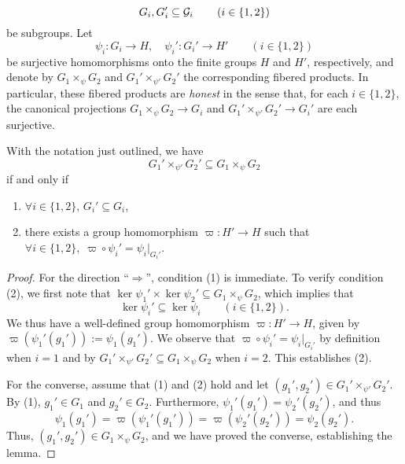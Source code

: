 \[
G_i, G_i' \subseteq \mathcal{G}_i \quad\quad \left( i \in \{1, 2 \} \right)
\]
be subgroups.  Let
\[
\psi_i : G_i \longrightarrow H, \quad \psi_i' : G_i' \longrightarrow H' \quad\quad \left( i \in \{1, 2 \} \right)
\]
be surjective homomorphisms onto the finite groups $H$ and $H'$, respectively, and denote by $G_1 \times_\psi G_2$ and $G_1' \times_{\psi'} G_2'$ the corresponding fibered products.  In particular, these fibered products are \emph{honest} in the sense that, for each $i \in \{1, 2 \}$, the canonical projections $G_1 \times_\psi G_2 \longrightarrow G_i$ and $G_1' \times_{\psi'} G_2' \longrightarrow G_i'$ are each surjective.
\begin{lemma} \label{whenisgroupinsidefiberedproduct}
With the notation just outlined, we have
\[
G_1' \times_{\psi'} G_2' \subseteq G_1 \times_{\psi} G_2
\]
if and only if
\begin{enumerate}
\item $\forall i \in \{ 1, 2 \}, \, G_i' \subseteq G_i$,
\item there exists a group homomorphism $\varpi : H' \longrightarrow H$ such that $\forall i \in \{1, 2 \}, \; \varpi \circ \psi_i' = \psi_i \vert_{G_i'}$.
\end{enumerate}
\end{lemma}
\begin{proof}
For the direction ``$\Rightarrow$'', condition (1) is immediate.  To verify condition (2), we first note that $\ker \psi_1' \times \ker \psi_2' \subseteq G_1 \times_\psi G_2$, which implies that
\[
\ker \psi_i' \subseteq \ker \psi_i \quad\quad \left( i \in \{1, 2 \} \right).
\]
We thus have a well-defined group homomorphism $\varpi : H' \longrightarrow H$, given by $\varpi \left( \psi_1'(g_1') \right) := \psi_1(g_1')$.
We observe that $\varpi \circ \psi_i' = \psi_i \vert_{G_i'}$ by definition when $i = 1$ and by $G_1' \times_{\psi'} G_2' \subseteq G_1 \times_{\psi} G_2$ when $i = 2$.  This establishes (2).

For the converse, assume that (1) and (2) hold and let $(g_1', g_2') \in G_1' \times_{\psi'} G_2'$.  By (1), $g_1' \in G_1$ and $g_2' \in G_2$.  Furthermore, $\psi_1'(g_1') = \psi_2'(g_2')$, and thus
\[
\psi_1(g_1') = \varpi \left( \psi_1'(g_1') \right) = \varpi \left( \psi_2'(g_2') \right) = \psi_2(g_2').
\]
Thus, $(g_1',g_2') \in G_1 \times_\psi G_2$, and we have proved the converse, establishing the lemma.
\end{proof}


